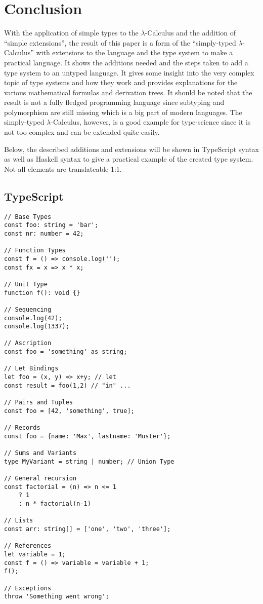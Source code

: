 \section{Conclusion}

With the application of simple types to the $\lambda$-Calculus
and the addition of ``simple extensions'', the result of this paper
is a form of the ``simply-typed $\lambda$-Calculus'' with extensions to
the language and the type system to make a practical language. It shows
the additions needed and the steps taken to add a type system to an
untyped language. It gives some insight into the very complex topic
of type systems and how they work and provides explanations for the
various mathematical formulas and derivation trees. It should be
noted that the result is not a fully fledged programming language since
subtyping and polymorphism are still missing which is a big part of
modern languages. The simply-typed $\lambda$-Calculus, however, is
a good example for type-science since it is not too complex and
can be extended quite easily.

Below, the described additions and extensions will be shown in
TypeScript syntax as well as Haskell syntax to give a practical
example of the created type system. Not all elements are
translateable 1:1.

\subsection*{TypeScript}

\begin{verbatim}
// Base Types
const foo: string = 'bar';
const nr: number = 42;

// Function Types
const f = () => console.log('');
const fx = x => x * x;

// Unit Type
function f(): void {}

// Sequencing
console.log(42);
console.log(1337);

// Ascription
const foo = 'something' as string;

// Let Bindings
let foo = (x, y) => x+y; // let
const result = foo(1,2) // "in" ...

// Pairs and Tuples
const foo = [42, 'something', true];

// Records
const foo = {name: 'Max', lastname: 'Muster'};

// Sums and Variants
type MyVariant = string | number; // Union Type

// General recursion
const factorial = (n) => n <= 1
    ? 1
    : n * factorial(n-1)

// Lists
const arr: string[] = ['one', 'two', 'three'];

// References
let variable = 1;
const f = () => variable = variable + 1;
f();

// Exceptions
throw 'Something went wrong';
\end{verbatim}

